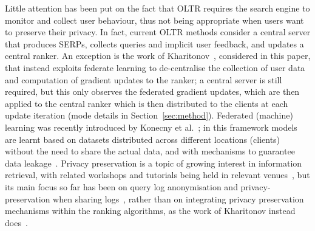 Little attention has been put on the fact that OLTR requires the search engine to monitor and collect user behaviour, thus not being appropriate when users want to preserve their privacy. In fact, current OLTR methods consider a central server that produces SERPs, collects queries and implicit user feedback, and updates a central ranker. An exception is the work of Kharitonov~\cite{kharitonov2019federated}, considered in this paper, that instead exploits federate learning to de-centralise the collection of user data and computation of gradient updates to the ranker; a central server is still required, but this only observes the federated gradient updates, which are then applied to the central ranker which is then distributed to the clients at each update iteration (mode details in Section~\ref{sec:method}). Federated (machine) learning was recently introduced by Konecny et al.~\cite{DBLP:journals/corr/KonecnyMRR16,DBLP:journals/corr/KonecnyMYRSB16}; in this framework models are learnt based on datasets distributed across different locations (clients) without the need to share the actual data, and with mechanisms to guarantee data leakage~\cite{yang2019federated}. 
Privacy preservation is a topic of growing interest in information retrieval, with related workshops and tutorials being held in relevant venues~\cite{yang2016privacy,yang2017differential}, but its main focus so far has been on query log anonymisation and privacy-preservation when sharing logs~\cite{cooper2008survey,korolova2009releasing,zhang2016anonymizing}, rather than on integrating privacy preservation mechanisms within the ranking algorithms, as the work of Kharitonov instead does~\cite{kharitonov2019federated}.

%
%
%

